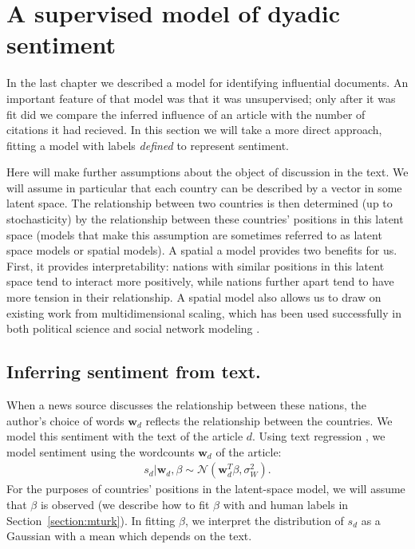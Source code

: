 \section{A supervised model of dyadic sentiment}

\label{section:foreign_relations_supervised_model}

In the last chapter we described a model for identifying influential
documents.  An important feature of that model was that it was
unsupervised; only after it was fit did we compare the inferred
influence of an article with the number of citations it had recieved.
In this section we will take a more direct approach, fitting a
model with labels \emph{defined} to represent sentiment.

Here will make further assumptions about the object of discussion in
the text. We will assume in particular that each country can be
described by a vector in some latent space.  The relationship between
two countries is then determined (up to stochasticity) by the
relationship between these countries' positions in this latent space
(models that make this assumption are sometimes referred to as latent
space models or spatial models).  A spatial a model provides two
benefits for us. First, it provides interpretability: nations with similar
positions in this latent space tend to interact more positively, while
nations further apart tend to have more tension in their relationship.
A spatial model also allows us to draw on existing work from
multidimensional scaling, which has been used successfully in both
political science \cite{martin:2002,jackman:2001} and social network
modeling \cite{hoff:2002,chang:2009}.

\subsection{Inferring sentiment from text.}
\label{section:text_regression}
When a news source discusses the relationship between these nations,
the author's choice of words $\bm w_d$ reflects the relationship
between the countries.  We model this sentiment with the text of the
article $d$.  Using text regression \cite{kogan:2009}, we model
sentiment using the wordcounts $\bm w_d$ of the article:
\begin{align}
  s_d | \bm w_d, \beta \sim \mathcal{N}( \bm w_d^T \beta, \sigma_W^2 ).
  \label{eq:sentiment_text}
\end{align}
For the purposes of countries' positions in the latent-space model, we
will assume that $\beta$ is observed (we describe how to fit $\beta$
with  and human labels in
Section~\ref{section:mturk}).  In fitting $\beta$, we interpret the
distribution of $s_d$ as a Gaussian with a mean which depends on the
text.

